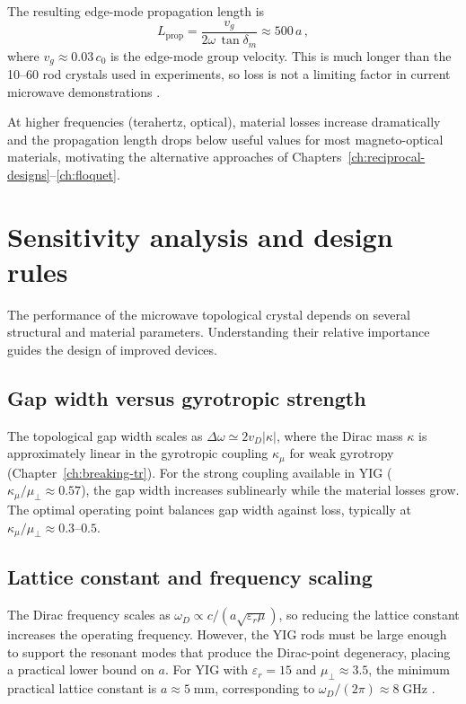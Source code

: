 The resulting edge-mode propagation length is
\begin{equation}\label{eq:ch9-propagation-length}
  L_{\mathrm{prop}} = \frac{v_g}{2\omega\,\tan\delta_m}
  \approx 500\,a\,,
\end{equation}
where $v_g\approx 0.03\,c_0$ is the edge-mode group velocity.  This
is much longer than the 10--60 rod crystals used in experiments, so
loss is not a limiting factor in current microwave demonstrations
\cite{nature2026observation,price2022roadmap}.

At higher frequencies (terahertz, optical), material losses increase
dramatically and the propagation length drops below useful values for
most magneto-optical materials, motivating the alternative approaches
of Chapters~\ref{ch:reciprocal-designs}--\ref{ch:floquet}.

\section{Sensitivity analysis and design rules}
\label{sec:ch9-sensitivity}

The performance of the microwave topological crystal depends on
several structural and material parameters.  Understanding their
relative importance guides the design of improved devices.

\subsection{Gap width versus gyrotropic strength}
\label{sec:ch9-gap-vs-gyro}

The topological gap width scales as $\Delta\omega\simeq 2v_D|\kappa|$,
where the Dirac mass $\kappa$ is approximately linear in the gyrotropic
coupling $\kappa_\mu$ for weak gyrotropy
(Chapter~\ref{ch:breaking-tr}).  For the strong coupling
available in YIG ($\kappa_\mu/\mu_\perp\approx 0.57$), the gap width increases sublinearly while the material losses grow.
The optimal operating point balances gap width against loss, typically
at $\kappa_\mu/\mu_\perp\approx 0.3$--$0.5$.

\subsection{Lattice constant and frequency scaling}
\label{sec:ch9-scaling}

The Dirac frequency scales as $\omega_D\propto c/(a\sqrt{\varepsilon_r\mu})$,
so reducing the lattice constant increases the operating frequency.
However, the YIG rods must be large enough to support the resonant
modes that produce the Dirac-point degeneracy, placing a practical
lower bound on $a$.  For YIG with $\varepsilon_r=15$ and
$\mu_\perp\approx 3.5$, the minimum practical lattice constant is
$a\approx 5\;\mathrm{mm}$, corresponding to $\omega_D/(2\pi)
\approx 8\;\mathrm{GHz}$ \cite{nature2026observation,
skirlo2015experimental}.


